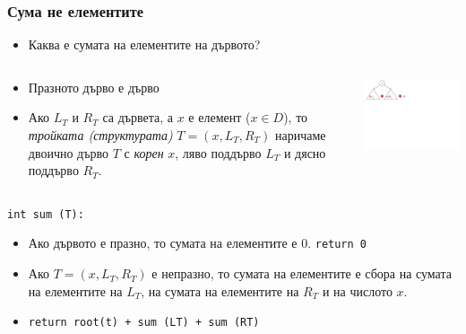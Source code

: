 \documentclass{beamer}
\begin{document}
\begin{frame}[fragile]
\frametitle{Сума не елементите}

    \begin{itemize}
      \item Каква е сумата на елементите на дървото? 
    \end{itemize}


\begin{columns}[t]
  \begin{column}{0.65\textwidth}

    \begin{flushleft}
    \begin{itemize}
      \item Празното дърво е дърво 
      \item Ако $L_T$ и $R_T$ са дървета, а $x$ е елемент ($x \in D$), то \emph{тройката (структурата)} $T=(x,L_T,R_T)$ наричаме двоично дърво $T$ с \emph{корен} $x$, ляво поддърво $L_T$ и дясно поддърво $R_T$.
    \end{itemize}
    \end{flushleft}

  \end{column}
  \begin{column}{0.35\textwidth}

    \includegraphics[width=8cm]{images/tree_recursive_op_sum}

  \end{column}
\end{columns}

\vspace{-100px}

 \texttt{int sum (T):}

    \begin{itemize}
      \item Ако дървото е празно, то сумата на елементите е $0$. \texttt{return 0} 
      \item  Ако $T=(x,L_T,R_T)$ е непразно, то сумата на елементите е сбора на сумата на елементите на $L_T$, на сумата на елементите на $R_T$ и на числото $x$.
      \item \texttt{return root(t) + sum (LT) + sum (RT)} 
    \end{itemize}

\end{frame}
\end{document}
